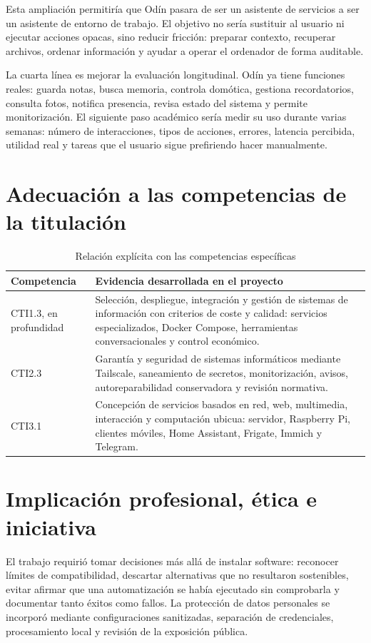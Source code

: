Esta ampliación permitiría que Odín pasara de ser un asistente de servicios a ser un asistente de entorno de trabajo. El objetivo no sería sustituir al usuario ni ejecutar acciones opacas, sino reducir fricción: preparar contexto, recuperar archivos, ordenar información y ayudar a operar el ordenador de forma auditable.

La cuarta línea es mejorar la evaluación longitudinal. Odín ya tiene funciones reales: guarda notas, busca memoria, controla domótica, gestiona recordatorios, consulta fotos, notifica presencia, revisa estado del sistema y permite monitorización. El siguiente paso académico sería medir su uso durante varias semanas: número de interacciones, tipos de acciones, errores, latencia percibida, utilidad real y tareas que el usuario sigue prefiriendo hacer manualmente.

\section{Adecuación a las competencias de la titulación}
\begin{table}[H]
  \centering
  \caption{Relación explícita con las competencias específicas}
  \label{tab:competencias}
  \begin{tabularx}{\textwidth}{lX}
    \toprule
    Competencia & Evidencia desarrollada en el proyecto \\
    \midrule
    CTI1.3, en profundidad & Selección, despliegue, integración y gestión de sistemas de información con criterios de coste y calidad: servicios especializados, Docker Compose, herramientas conversacionales y control económico. \\
    CTI2.3 & Garantía y seguridad de sistemas informáticos mediante Tailscale, saneamiento de secretos, monitorización, avisos, autoreparabilidad conservadora y revisión normativa. \\
    CTI3.1 & Concepción de servicios basados en red, web, multimedia, interacción y computación ubicua: servidor, Raspberry Pi, clientes móviles, Home Assistant, Frigate, Immich y Telegram. \\
    \bottomrule
  \end{tabularx}
\end{table}

\section{Implicación profesional, ética e iniciativa}
El trabajo requirió tomar decisiones más allá de instalar software: reconocer límites de compatibilidad, descartar alternativas que no resultaron sostenibles, evitar afirmar que una automatización se había ejecutado sin comprobarla y documentar tanto éxitos como fallos. La protección de datos personales se incorporó mediante configuraciones sanitizadas, separación de credenciales, procesamiento local y revisión de la exposición pública.

